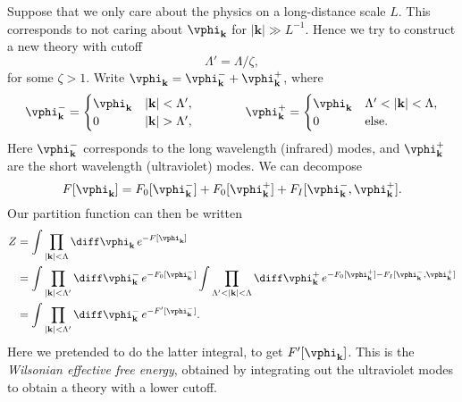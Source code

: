 \documentclass[12pt]{article}
\begin{document}
Suppose that we only care about the physics on a long-distance scale $L$. This corresponds to not caring about $\vphi_{\mathbf{k}}$ for $|\mathbf{k}| \gg L^{-1}$. Hence we try to construct a new theory with cutoff
\[
\Lambda' = \Lambda/\zeta,
\]
for some $\zeta > 1$. Write $\vphi_{\mathbf{k}} = \vphi_{\mathbf{k}}^{-} + \vphi_{\mathbf{k}}^+$, where
\[
\vphi_{\mathbf{k}}^{-} =
\begin{cases}
	\vphi_{\mathbf{k}} & |\mathbf{k}| < \Lambda',\\
	0 & |\mathbf{k}| > \Lambda',
\end{cases}
\qquad \qquad \vphi_{\mathbf{k}}^+ =
\begin{cases}
	\vphi_{\mathbf{k}} & \Lambda' < |\mathbf{k}| < \Lambda, \\
	0 & \text{else}.
\end{cases}
\]
Here $\vphi_{\mathbf{k}}^{-}$ corresponds to the long wavelength (infrared) modes, and $\vphi_{\mathbf{k}}^{+}$ are the short wavelength (ultraviolet) modes. We can decompose
\[
	F[\vphi_{\mathbf{k}}] = F_0[\vphi_{\mathbf{k}}^{-}] + F_0[\vphi_{\mathbf{k}}^+] + F_I[\vphi_{\mathbf{k}}^{-}, \vphi_{ \mathbf{k}}^{+}].
\]
Our partition function can then be written
\begin{align*}
	Z &= \int \prod_{|\mathbf{k}| < \Lambda} \diff \vphi_{\mathbf{k}} \, e^{- F[\vphi_{\mathbf{k}}]} \\
	  &= \int \prod_{|\mathbf{k}| < \Lambda'} \diff \vphi_{\mathbf{k}}^{-} \, e^{-F_0[\vphi_{\mathbf{k}}^{-}]} \int \prod_{\Lambda' < |\mathbf{k}| < \Lambda} \diff \vphi_{\mathbf{k}}^{+} \, e^{- F_0[\vphi_{\mathbf{k}}^{+}] - F_I[\vphi_{\mathbf{k}}^-, \vphi_{\mathbf{k}}^+]} \\
	  &= \int \prod_{|\mathbf{k}| < \Lambda'} \diff \vphi_{\mathbf{k}}^{-} \, e^{-F'[\vphi_{\mathbf{k}}^-]}.
\end{align*}
Here we pretended to do the latter integral, to get $F'[\vphi_{\mathbf{k}}]$. This is the \emph{Wilsonian effective free energy}, obtained by integrating out the ultraviolet modes to obtain a theory with a lower cutoff.
\end{document}
